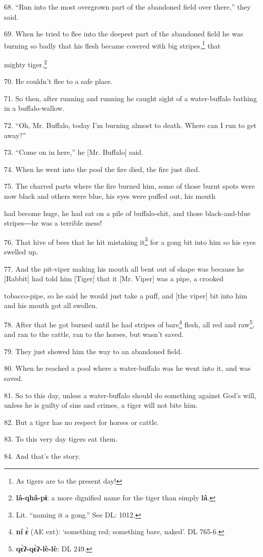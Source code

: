 68. ``Run into the most overgrown part of the abandoned field over there,'' they
said.

69. When he tried to flee into the deepest part of the abandoned field he was burning
so badly that his flesh became covered with big stripes,\footnote{As tigers are to the present day!} that

mighty tiger.\footnote{\textbf{lâ-qhâ-pɨ}: a more dignified name for the tiger than simply \textbf{lâ}.}

70. He couldn't flee to a safe place.

71. So then, after running and running he caught sight of a water-buffalo bathing
in a buffalo-wallow.

72. ``Oh, Mr. Buffalo, today I'm burning almost to death. Where can I run to get
away?''

73. ``Come on in here,'' he [Mr. Buffalo] said.

74. When he went into the pool the fire died, the fire just died.

75. The charred parts where the fire burned him, some of those burnt spots were
now black and others were blue, his eyes were puffed out, his mouth

had become huge, he had sat on a pile of buffalo-shit, and those black-and-blue
stripes―he was a terrible mess!

76. That hive of bees that he hit mistaking it\footnote{Lit. ``naming it a gong.'' See DL: 1012.} for a gong bit into him so his
eyes swelled up.

77. And the pit-viper making his mouth all bent out of shape was because he [Rabbit]
had told him [Tiger] that it [Mr. Viper] was a pipe, a crooked

tobacco-pipe, so he said he would just take a puff, and [the viper] bit into him
and his mouth got all swollen.

78. After that he got burned until he had stripes of bare\footnote{\textbf{ní} \textbf{ɛ̀} (AE ext): `something red; something bare, naked'. DL 765-6.} flesh, all red and
raw\footnote{\textbf{qɛ̀ʔ-qɛ̀ʔ-lè-lè}: DL 249.}, and ran to the cattle, ran to the horses, but wasn't saved.

79. They just showed him the way to an abandoned field.

80. When he reached a pool where a water-buffalo was he went into it, and was saved.

81. So to this day, unless a water-buffalo should do something against God's will,
unless he is guilty of sins and crimes, a tiger will not bite him.

82. But a tiger has no respect for horses or cattle.

83. To this very day tigers eat them.

84. And that's the story.

